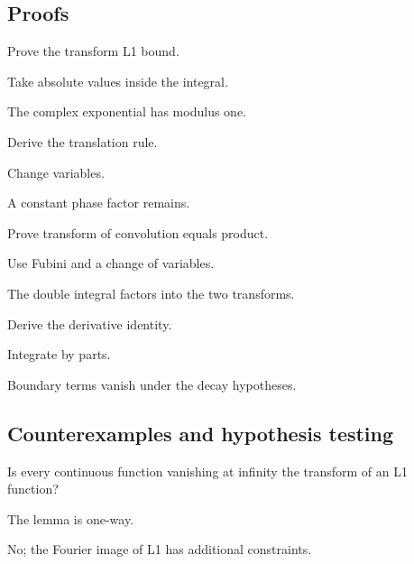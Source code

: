\subsection*{Proofs}

\begin{exercise}\label{exr:iii11-expand-06}
Prove the transform L1 bound.
\end{exercise}
\begin{hint}
Take absolute values inside the integral.
\end{hint}
\begin{solution}
The complex exponential has modulus one.
\end{solution}

\begin{exercise}\label{exr:iii11-expand-07}
Derive the translation rule.
\end{exercise}
\begin{hint}
Change variables.
\end{hint}
\begin{solution}
A constant phase factor remains.
\end{solution}

\begin{exercise}\label{exr:iii11-expand-08}
Prove transform of convolution equals product.
\end{exercise}
\begin{hint}
Use Fubini and a change of variables.
\end{hint}
\begin{solution}
The double integral factors into the two transforms.
\end{solution}

\begin{exercise}\label{exr:iii11-expand-09}
Derive the derivative identity.
\end{exercise}
\begin{hint}
Integrate by parts.
\end{hint}
\begin{solution}
Boundary terms vanish under the decay hypotheses.
\end{solution}

\subsection*{Counterexamples and hypothesis testing}

\begin{exercise}\label{exr:iii11-expand-10}
Is every continuous function vanishing at infinity the transform of an L1 function?
\end{exercise}
\begin{hint}
The lemma is one-way.
\end{hint}
\begin{solution}
No; the Fourier image of L1 has additional constraints.
\end{solution}

